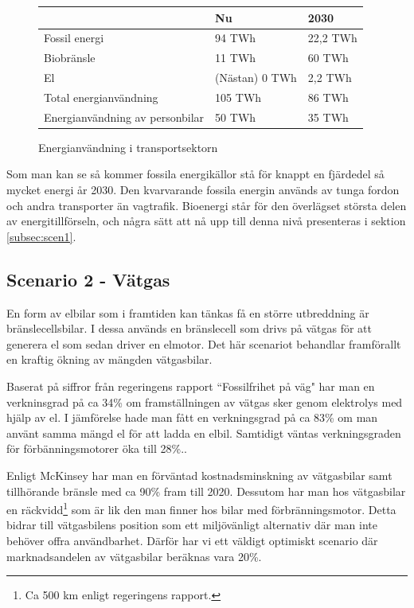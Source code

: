 \documentclass[a4paper,11pt,fleqn, titlepage]{article}
\begin{document}
\begin{figure}[h!]
	\begin{center}
	\begin{tabular}{ | l | l | l | }
	\hline
						& Nu		& 2030 \\ \hline
	Fossil energi				& 94 TWh	& 22,2 TWh \\ \hline
	Biobränsle				& 11 TWh	& 60 TWh \\ \hline %
	El					& (Nästan) 0 TWh &  2,2 TWh \\ \hline %
	Total energianvändning		& 105 TWh	& 86 TWh \\ \hline
	Energianvändning av personbilar	& 50 TWh	& 35 TWh \\ \hline
	\end{tabular}
	\caption{Energianvändning i transportsektorn}
	\label{tab:scen1energi}
\end{center}
\end{figure}

Som man kan se så kommer fossila energikällor stå för knappt en fjärdedel så mycket energi år 2030. Den kvarvarande fossila energin används av tunga fordon och andra transporter än vagtrafik. Bioenergi står för den överlägset största delen av energitillförseln, och några sätt att nå upp till denna nivå presenteras i sektion \ref{subsec:scen1}.

\subsection{Scenario 2 - Vätgas}
En form av elbilar som i framtiden kan tänkas få en större utbreddning är bränslecellsbilar.
I dessa används en bränslecell som drivs på vätgas för att generera el som sedan
driver en elmotor. Det här scenariot behandlar framförallt en kraftig ökning av mängden vätgasbilar.

Baserat på siffror från regeringens rapport ``Fossilfrihet på väg" har man en verkninsgrad på ca 34\%
om framställningen av vätgas sker genom elektrolys med hjälp av el. I jämförelse hade man fått en
verkningsgrad på ca 83\% om man använt samma mängd el för att ladda en elbil. Samtidigt väntas
verkningsgraden för förbänningsmotorer öka till 28\%.\cite{regeringen}.

Enligt McKinsey har man en förväntad kostnadsminskning av vätgasbilar samt tillhörande bränsle med
ca 90\% fram till 2020.\cite{McKinsey} Dessutom har man hos vätgasbilar en räckvidd\footnote{Ca 500 km enligt regeringens rapport.} som är lik den man finner hos bilar
med förbränningsmotor. Detta bidrar till vätgasbilens position som ett miljövänligt alternativ där
man inte behöver offra användbarhet. Därför har vi ett väldigt optimiskt scenario där marknadsandelen av
vätgasbilar beräknas vara 20\%.
\end{document}
